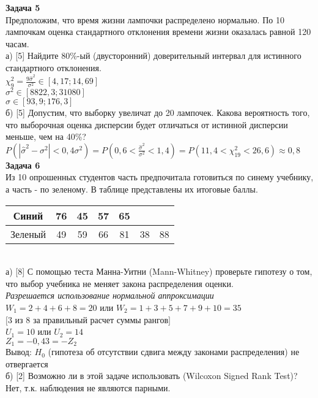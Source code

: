 \documentclass[pdftex,12pt,a4paper]{article}
\begin{document}
{\bf Задача 5} \\
Предположим, что время жизни лампочки распределено нормально. По
10 лампочкам оценка стандартного отклонения времени жизни
оказалась равной 120 часам. \\
а) [5] Найдите 80\%-ый (двусторонний)
доверительный интервал для истинного стандартного отклонения. \\
$\chi_{9}^{2}=\frac{9\hat{\sigma}^{2}}{\sigma^{2}} \in [4,17;14,69]$ \\
$\sigma^{2} \in [8822,3;31080]$ \\
$\sigma \in [93,9;176,3] $ \\
б) [5] Допустим, что выборку увеличат до 20 лампочек. Какова
вероятность того, что выборочная оценка дисперсии будет отличаться
от истинной дисперсии меньше, чем на 40\%? \\
$P(|\hat{\sigma}^{2}-\sigma^{2}|<0,4\sigma^{2})=
P(0,6<\frac{\hat{\sigma}^{2}}{\sigma^{2}}<1,4)=
P(11,4<\chi_{19}^{2}<26,6)\approx 0,8$ \\


{\bf Задача 6} \\
Из 10 опрошенных студентов часть предпочитала готовиться по синему
учебнику, а часть - по зеленому. В таблице представлены их
итоговые баллы.  \\
\begin{tabular}{|c|c|c|c|c|c|c|}
  \hline
  Синий & 76 & 45 & 57 & 65 &  &  \\
  \hline
  Зеленый & 49 & 59 & 66 & 81 & 38 & 88 \\
  \hline
\end{tabular} \\
а) [8] С помощью теста Манна-Уитни (Mann-Whitney) проверьте
гипотезу о
том, что выбор учебника не меняет закона распределения оценки. \\
\emph{Разрешается использование нормальной аппроксимации} \\
$W_{1}=2+4+6+8=20$ или $W_{2}=1+3+5+7+9+10=35$ \\
$[$3 из 8 за правильный расчет суммы рангов$]$ \\
$U_{1}=10$ или $U_{2}=14$ \\
$Z_{1}=-0,43=-Z_{2}$ \\
Вывод: $H_{0}$ (гипотеза об отсутствии сдвига между законами
распределения) не отвергается \\
б) [2] Возможно ли в этой задаче использовать (Wilcoxon Signed Rank Test)? \\
Нет, т.к. наблюдения не являются парными. \\
\end{document}

